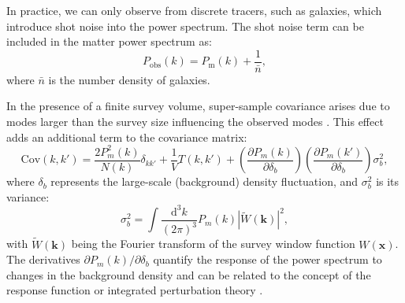 In practice, we can only observe from discrete tracers, such as galaxies, which introduce shot noise into the power spectrum. The shot noise term can be included in the matter power spectrum as:
\begin{equation}
    P_{\text{obs}}(k) = P_{\mathrm{m}}(k) + \frac{1}{\bar{n}},
\end{equation}
where \( \bar{n} \) is the number density of galaxies.

In the presence of a finite survey volume, super-sample covariance arises due to modes larger than the survey size influencing the observed modes \citep{PhysRevD.87.123504}. This effect adds an additional term to the covariance matrix:
\begin{equation}
    \mathrm{Cov}(k, k') = \frac{2 P_m^2(k)}{N(k)} \delta_{kk'} + \frac{1}{V} T(k, k') + \left( \frac{\partial P_m(k)}{\partial \delta_b} \right) \left( \frac{\partial P_m(k')}{\partial \delta_b} \right) \sigma_b^2,
\end{equation}
where \( \delta_b \) represents the large-scale (background) density fluctuation, and \( \sigma_b^2 \) is its variance:
\begin{equation}
    \sigma_b^2 = \int \frac{\mathrm{d}^3 k}{(2\pi)^3} P_m(k) |\tilde{W}(\mathbf{k})|^2,
\end{equation}
with \( \tilde{W}(\mathbf{k}) \) being the Fourier transform of the survey window function \( W(\mathbf{x}) \).
The derivatives \( \partial P_m(k) / \partial \delta_b \) quantify the response of the power spectrum to changes in the background density and can be related to the concept of the response function or integrated perturbation theory \citep{2014PhRvD..89h3519L}.

